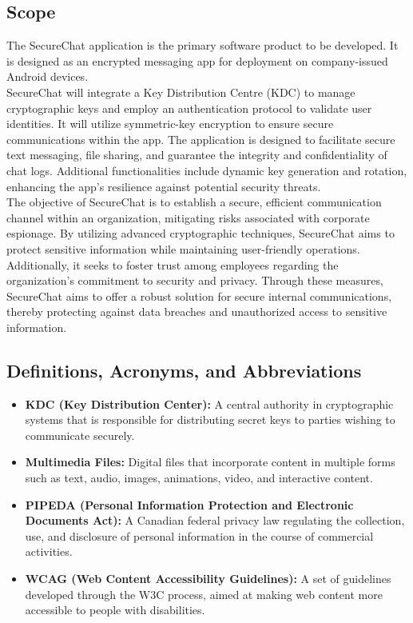 \documentclass[]{article}
\begin{document}
\subsection{Scope}
\label{sub:scope}
The SecureChat application is the primary software product to be developed. It is designed as an encrypted messaging app for deployment on company-issued Android devices.\\
SecureChat will integrate a Key Distribution Centre (KDC) to manage cryptographic keys and employ an authentication protocol to validate user identities. It will utilize symmetric-key encryption to ensure secure communications within the app. The application is designed to facilitate secure text messaging, file sharing, and guarantee the integrity and confidentiality of chat logs. Additional functionalities include dynamic key generation and rotation, enhancing the app's resilience against potential security threats.\\
The objective of SecureChat is to establish a secure, efficient communication channel within an organization, mitigating risks associated with corporate espionage. By utilizing advanced cryptographic techniques, SecureChat aims to protect sensitive information while maintaining user-friendly operations. Additionally, it seeks to foster trust among employees regarding the organization's commitment to security and privacy. Through these measures, SecureChat aims to offer a robust solution for secure internal communications, thereby protecting against data breaches and unauthorized access to sensitive information.

\subsection{Definitions, Acronyms, and Abbreviations}
\label{sub:definitions_acronyms_and_abbreviations}
\begin{itemize}
	\item \textbf{KDC (Key Distribution Center):} A central authority in cryptographic systems that is responsible for distributing secret keys to parties wishing to communicate securely.
	\item \textbf{Multimedia Files:} Digital files that incorporate content in multiple forms such as text, audio, images, animations, video, and interactive content.
	\item \textbf{PIPEDA (Personal Information Protection and Electronic Documents Act):} A Canadian federal privacy law regulating the collection, use, and disclosure of personal information in the course of commercial activities.
	\item \textbf{WCAG (Web Content Accessibility Guidelines):} A set of guidelines developed through the W3C process, aimed at making web content more accessible to people with disabilities.
\end{itemize}
\end{document}
